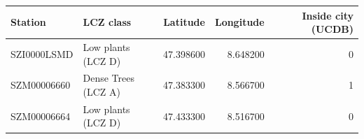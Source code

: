 \begin{tabular}{llrrr}
\toprule
Station & LCZ class & Latitude & Longitude & Inside city (UCDB) \\
\midrule
SZI0000LSMD & Low plants (LCZ D) & 47.398600 & 8.648200 & 0 \\
SZM00006660 & Dense Trees (LCZ A) & 47.383300 & 8.566700 & 1 \\
SZM00006664 & Low plants (LCZ D) & 47.433300 & 8.516700 & 0 \\
\bottomrule
\end{tabular}
